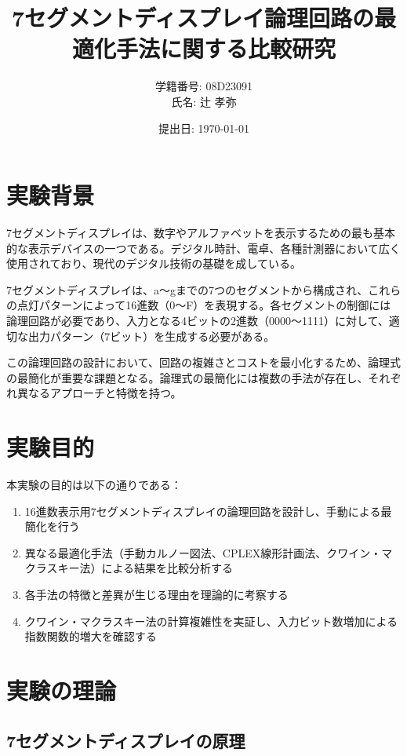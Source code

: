 \documentclass[a4j,dvipdfmx]{jsarticle}
\title{7セグメントディスプレイ論理回路の最適化手法に関する比較研究}
\author{学籍番号: 08D23091 \\ 氏名: 辻 孝弥}
\date{提出日: \today}
\begin{document}
\maketitle

\section{実験背景}

7セグメントディスプレイは、数字やアルファベットを表示するための最も基本的な表示デバイスの一つである。デジタル時計、電卓、各種計測器において広く使用されており、現代のデジタル技術の基礎を成している。

7セグメントディスプレイは、a〜gまでの7つのセグメントから構成され、これらの点灯パターンによって16進数（0〜F）を表現する。各セグメントの制御には論理回路が必要であり、入力となる4ビットの2進数（0000〜1111）に対して、適切な出力パターン（7ビット）を生成する必要がある。

この論理回路の設計において、回路の複雑さとコストを最小化するため、論理式の最簡化が重要な課題となる。論理式の最簡化には複数の手法が存在し、それぞれ異なるアプローチと特徴を持つ。

\section{実験目的}

本実験の目的は以下の通りである：

\begin{enumerate}
\item 16進数表示用7セグメントディスプレイの論理回路を設計し、手動による最簡化を行う
\item 異なる最適化手法（手動カルノー図法、CPLEX線形計画法、クワイン・マクラスキー法）による結果を比較分析する
\item 各手法の特徴と差異が生じる理由を理論的に考察する
\item クワイン・マクラスキー法の計算複雑性を実証し、入力ビット数増加による指数関数的増大を確認する
\end{enumerate}

\section{実験の理論}

\subsection{7セグメントディスプレイの原理}
\end{document}
